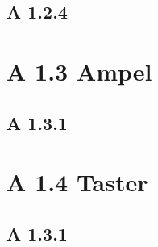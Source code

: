 \documentclass[11pt,a4paper,ngerman]{article}
\begin{document}
\subsection*{A 1.2.4}
\section*{A 1.3 Ampel}
\subsection*{A 1.3.1}
\section*{A 1.4 Taster}
\subsection*{A 1.3.1}
\label{LastPage}
\end{document}
